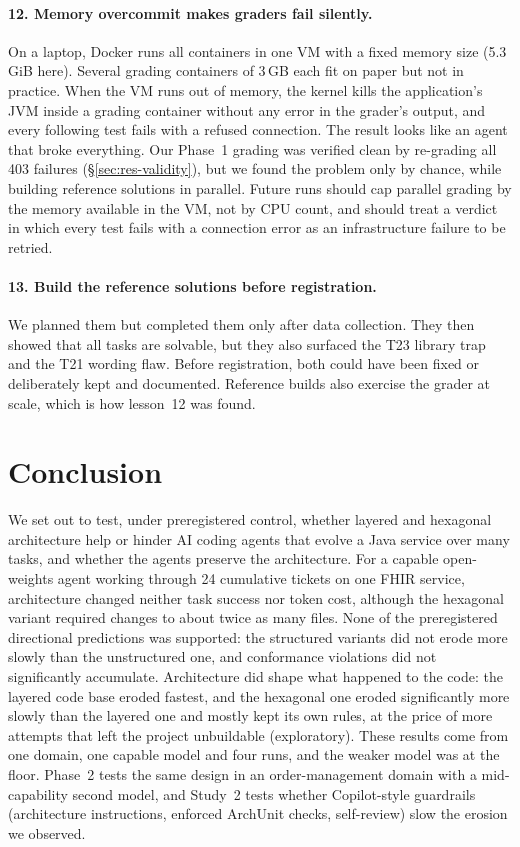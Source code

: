 \documentclass[10pt]{article}
\begin{document}
\paragraph{12. Memory overcommit makes graders fail silently.} On a laptop, Docker runs all containers in one
VM with a fixed memory size (5.3\,GiB here). Several grading containers of 3\,GB each fit on paper
but not in practice. When the VM runs out of memory, the kernel kills the application's JVM inside a
grading container without any error in the grader's output, and every following test fails with a
refused connection. The result looks like an agent that broke everything. Our Phase~1 grading was
verified clean by re-grading all 403 failures (\S\ref{sec:res-validity}), but we found the problem
only by chance, while building reference solutions in parallel. Future runs should cap parallel
grading by the memory available in the VM, not by CPU count, and should treat a verdict in which
every test fails with a connection error as an infrastructure failure to be retried.

\paragraph{13. Build the reference solutions before registration.} We planned them but completed
them only after data collection. They then showed that all tasks are solvable, but they also
surfaced the T23 library trap and the T21 wording flaw. Before registration, both could have been
fixed or deliberately kept and documented. Reference builds also exercise the grader at scale, which
is how lesson~12 was found.

\section{Conclusion}\label{sec:conclusion}

We set out to test, under preregistered control, whether layered and hexagonal architecture help
or hinder AI coding agents that evolve a Java service over many tasks, and whether the agents
preserve the architecture. For a capable open-weights agent working through 24 cumulative tickets
on one FHIR service, architecture changed neither task success nor token cost, although the
hexagonal variant required changes to about twice as many files. None of the preregistered
directional predictions was supported: the structured variants did not erode more slowly than the
unstructured one, and conformance violations did not significantly accumulate. Architecture did
shape what happened to the code: the layered code base eroded fastest, and the hexagonal one eroded
significantly more slowly than the layered one and mostly kept its own rules, at the price of more
attempts that left the project unbuildable (exploratory). These results come from one domain, one
capable model and four runs, and the weaker model was at the floor. Phase~2 tests the same design in
an order-management domain with a mid-capability second model, and Study~2 tests whether
Copilot-style guardrails (architecture instructions, enforced ArchUnit checks, self-review) slow
the erosion we observed.
\end{document}
